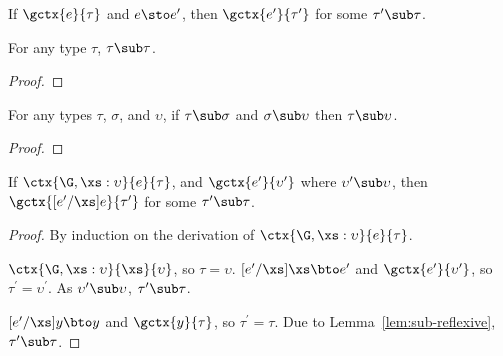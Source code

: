 \begin{theorem}[Preservation]\label{th:preservation}
  If $\gctx{e}{\tau}$ and $e \sto e^\prime$, then $\gctx{e^\prime}{\tau^\prime}$
  for some $\tau^\prime \sub \tau$.

  \begin{lemma}\label{lem:sub-reflexive}
    For any type $\tau$, $\tau \sub \tau$.

    \begin{proof}

    \end{proof}
  \end{lemma}

  \begin{lemma}\label{lem:sub-transitive}
    For any types $\tau$, $\sigma$, and $\upsilon$, if $\tau \sub \sigma$ and
    $\sigma \sub \upsilon$ then $\tau \sub \upsilon$.

    \begin{proof}

    \end{proof}
  \end{lemma}

  \begin{lemma}\label{lem:preservation}
    If $\ctx{\G, \xs : \upsilon}{e}{\tau}$, and
    $\gctx{e^\prime}{\upsilon^\prime}$ where $\upsilon^\prime \sub \upsilon$,
    then $\gctx{[e^\prime/\xs]e}{\tau^\prime}$ for some $\tau^\prime \sub \tau$.

    \begin{proof}
      By induction on the derivation of $\ctx{\G, \xs : \upsilon}{e}{\tau}$.

      $\ctx{\G, \xs : \upsilon}{\xs}{\upsilon}$, so $\tau = \upsilon$.
      $[e^\prime/\xs]\xs \bto e^\prime$ and $\gctx{e^\prime}{\upsilon^\prime}$,
      so $\tau^\prime = \upsilon^\prime$.  As $\upsilon^\prime \sub \upsilon$,
      $\tau^\prime \sub \tau$.

      $[e^\prime/\xs]y \bto y$ and $\gctx{y}{\tau}$, so $\tau^\prime = \tau$.
      Due to Lemma~\ref{lem:sub-reflexive}, $\tau^\prime \sub \tau$.


\end{proof}
\end{lemma}
\end{theorem}
